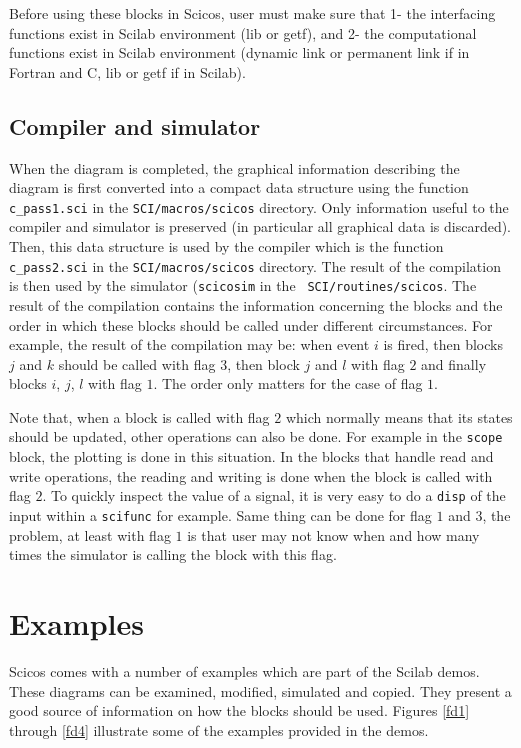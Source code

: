 Before using these blocks in Scicos, user must make sure that 1- the interfacing
functions exist in Scilab environment (lib or getf), and 2- the computational
functions exist in Scilab environment (dynamic link or permanent link if in
Fortran and C, lib or getf if in Scilab). 


\subsection{Compiler and simulator}
When the diagram is completed, the graphical information describing
the diagram is first converted into a compact data structure using the
function {\tt c\_pass1.sci} in the {\tt SCI/macros/scicos} directory. Only
information useful to the compiler and simulator is preserved (in
particular all graphical data is discarded). Then, this data structure
is used by the compiler which is the function {\tt c\_pass2.sci} in the
{\tt SCI/macros/scicos} directory. The result of the compilation is then
used by the simulator ({\tt scicosim} in the {\tt
SCI/routines/scicos}. The result of the compilation contains the
information concerning the blocks and the order
in which these blocks should be called under different
circumstances. For example, the result of the compilation may be: when
event $i$ is fired, then blocks $j$ 
and $k$ should be called with flag $3$, then block $j$ and $l$ with
flag $2$ and finally blocks $i$, $j$, $l$ with flag $1$. The order
only matters for the case of flag $1$.

Note that, when a block is called with flag $2$ which normally means
that its states should be updated, other operations can also be
done. For example in the {\tt scope} block, the plotting is done in
this situation. In the blocks that handle read and write operations,
the reading and writing is done when the block is called with flag
$2$. To quickly inspect the value of a signal, it is very easy to do a
{\tt disp} of the input within a {\tt scifunc} for example. Same thing
can be done for flag $1$ and $3$, the problem, at least with flag $1$
is that user may not know when and how many times the simulator is
calling the block with this flag. 


\section{Examples}
Scicos comes with a number of examples which are part of the Scilab
demos. These diagrams can be examined, modified, simulated and
copied. They present a good source of information on how the blocks
should be used. Figures \ref{fd1} through \ref{fd4} illustrate some of
the examples provided in the demos.


